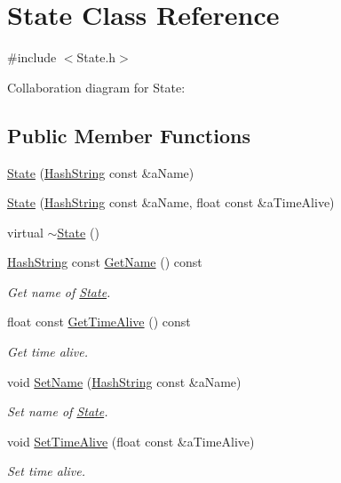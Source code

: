 \hypertarget{classState}{}\section{State Class Reference}
\label{classState}


{\ttfamily \#include $<$State.\+h$>$}



Collaboration diagram for State\+:
\subsection*{Public Member Functions}
\begin{DoxyCompactItemize}
\item 
\hyperlink{classState_ad056723b2fb3d6a16aebef82327d5dec}{State} (\hyperlink{classHashString}{Hash\+String} const \&a\+Name)
\item 
\hyperlink{classState_a766a212a61e5dbb27249d4389dbc2267}{State} (\hyperlink{classHashString}{Hash\+String} const \&a\+Name, float const \&a\+Time\+Alive)
\item 
virtual \hyperlink{classState_afab438d92b90dc18d194dbd9c9c8bab3}{$\sim$\+State} ()
\item 
\hyperlink{classHashString}{Hash\+String} const \hyperlink{classState_a743cd2106af466ac023fac7d34ff22c3}{Get\+Name} () const 
\begin{DoxyCompactList}\small\item\em Get name of \hyperlink{classState}{State}. \end{DoxyCompactList}\item 
float const \hyperlink{classState_ad2cdf4162d9aaf1f49c520f464b7969a}{Get\+Time\+Alive} () const 
\begin{DoxyCompactList}\small\item\em Get time alive. \end{DoxyCompactList}\item 
void \hyperlink{classState_a03afd06376c983c7979dd0b783ad9d81}{Set\+Name} (\hyperlink{classHashString}{Hash\+String} const \&a\+Name)
\begin{DoxyCompactList}\small\item\em Set name of \hyperlink{classState}{State}. \end{DoxyCompactList}\item 
void \hyperlink{classState_a5a505d57ab2f2606716e8bc4869cfbcb}{Set\+Time\+Alive} (float const \&a\+Time\+Alive)
\begin{DoxyCompactList}\small\item\em Set time alive. \end{DoxyCompactList}\end{DoxyCompactItemize}

